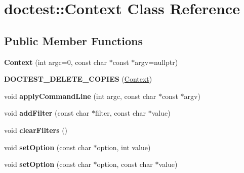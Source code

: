 \hypertarget{classdoctest_1_1_context}{}\section{doctest\+::Context Class Reference}
\label{classdoctest_1_1_context}
\subsection*{Public Member Functions}
\begin{DoxyCompactItemize}
\item 
\mbox{\label{classdoctest_1_1_context_a881bc2d0fe207d672e1debe830768a98}} 
{\bfseries Context} (int argc=0, const char $\ast$const $\ast$argv=nullptr)
\item 
\mbox{\label{classdoctest_1_1_context_ac93101dd788c427eae5ec5c425d21e01}} 
{\bfseries D\+O\+C\+T\+E\+S\+T\+\_\+\+D\+E\+L\+E\+T\+E\+\_\+\+C\+O\+P\+I\+ES} (\mbox{\hyperlink{classdoctest_1_1_context}{Context}})
\item 
\mbox{\label{classdoctest_1_1_context_ad55229220bf9ca74e6e0c6323bf672e1}} 
void {\bfseries apply\+Command\+Line} (int argc, const char $\ast$const $\ast$argv)
\item 
\mbox{\label{classdoctest_1_1_context_a60ad57a46c19db2b142468c3acac448a}} 
void {\bfseries add\+Filter} (const char $\ast$filter, const char $\ast$value)
\item 
\mbox{\label{classdoctest_1_1_context_aaa878723e89310d5aa3f516bc7ab3165}} 
void {\bfseries clear\+Filters} ()
\item 
\mbox{\label{classdoctest_1_1_context_a95e7a0230c5897f0eae36718f51d2f05}} 
void {\bfseries set\+Option} (const char $\ast$option, int value)
\item 
\mbox{\label{classdoctest_1_1_context_a4352ffc196c4ba56045270e45baa2754}} 
void {\bfseries set\+Option} (const char $\ast$option, const char $\ast$value)
\item 
\mbox{\label{classdoctest_1_1_context_a219b10301380b81c84c0824a6876d9aa}} 

\end{DoxyCompactItemize}
